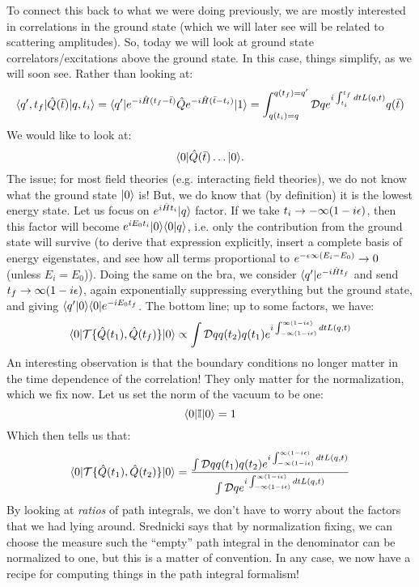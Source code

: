 To connect this back to what we were doing previously, we are mostly interested in correlations in the ground state (which we will later see will be related to scattering amplitudes). So, today we will look at ground state correlators/excitations above the ground state. In this case, things simplify, as we will soon see. Rather than looking at:
\begin{equation}
    \langle q', t_f \rvert\hat{Q}(\bar{t})\lvert q, t_i \rangle = \langle q' \rvert e^{-i\hat{H}(t_f - \bar{t})}\hat{Q}e^{-i\hat{H}(\bar{t} - t_i)}\lvert 1 \rangle = \int_{q(t_i) = q}^{q(t_f) = q'}\mathcal{D}q e^{i\int_{t_i}^{t_f}dt L(q, t)}q(\bar{t})
\end{equation}
We would like to look at:
\begin{equation}
    \langle 0 \rvert\hat{Q}(\bar{t})\ldots \lvert 0 \rangle.
\end{equation}
The issue; for most field theories (e.g. interacting field theories), we do not know what the ground state $\lvert 0 \rangle$ is! But, we do know that (by definition) it is the lowest energy state. Let us focus on $e^{i\hat{H}t_i}\lvert q \rangle$ factor. If we take $t_i \to -\infty(1 -i\epsilon)$, then this factor will become $e^{iE_0 t_i}\lvert 0 \rangle\langle 0 \lvert q \rangle$, i.e. only the contribution from the ground state will survive (to derive that expression explicitly, insert a complete basis of energy eigenstates, and see how all terms proportional to $e^{-\epsilon\infty(E_i - E_0)} \to 0$ (unless $E_i = E_0$)). Doing the same on the bra, we consider $\langle q' \rvert e^{-i\hat{H}t_f}$ and send $t_f \to \infty(1 - i\epsilon)$, again exponentially suppressing everything but the ground state, and giving $\langle q' \lvert 0 \rangle\langle 0 \rvert e^{-iE_0 t_f}$. The bottom line; up to some factors, we have:
\begin{equation}
    \langle 0 \rvert\mathcal{T}\{\hat{Q}(t_1), \hat{Q}(t_f)\}\lvert 0 \rangle \propto \int \mathcal{D}q q(t_2)q(t_1)e^{i\int_{-\infty(1-i\epsilon)}^{\infty(1-i\epsilon)}dt L(q, t)}
\end{equation}
An interesting observation is that the boundary conditions no longer matter in the time dependence of the correlation! They only matter for the normalization, which we fix now. Let us set the norm of the vacuum to be one:
\begin{equation}
    \langle 0 \rvert\mathbb{I}\lvert 0 \rangle = 1
\end{equation}
Which then tells us that:
\begin{equation}
    \langle 0 \rvert\mathcal{T}\{\hat{Q}(t_1), \hat{Q}(t_2)\}\lvert 0 \rangle = \frac{\int \mathcal{D}q q(t_1)q(t_2)e^{i\int_{-\infty(1-i\epsilon)}^{\infty(1-i\epsilon)}dt L(q, t)}}{\int \mathcal{D}q e^{i\int_{-\infty(1-i\epsilon)}^{\infty(1-i\epsilon)}dt L(q, t)}}
\end{equation}
By looking at \emph{ratios} of path integrals, we don't have to worry about the factors that we had lying around. Srednicki says that by normalization fixing, we can choose the measure such the ``empty'' path integral in the denominator can be normalized to one, but this is a matter of convention. In any case, we now have a recipe for computing things in the path integral formalism! 

